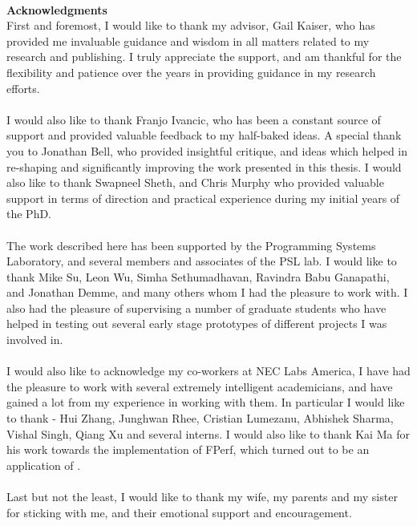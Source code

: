 ~\\[1in] %
\textbf{\Huge Acknowledgments}\\

\noindent 
First and foremost, I would like to thank my advisor, Gail Kaiser, who has provided me invaluable guidance and wisdom in all matters related to my research and publishing. I truly appreciate the support, and am thankful for the flexibility and patience over the years in providing guidance in my research efforts.
\\ \\
I would also like to thank Franjo Ivancic, who has been a constant source of support and provided valuable feedback to my half-baked ideas.
A special thank you to Jonathan Bell, who provided insightful critique, and ideas which helped in re-shaping and significantly improving the work presented in this thesis. I would also like to thank Swapneel Sheth, and Chris Murphy who provided valuable support in terms of direction and practical experience during my initial years of the PhD.
\\ \\
The work described here has been supported by the Programming Systems Laboratory, and several members and associates of the PSL lab. 
I would like to thank Mike Su, Leon Wu, Simha Sethumadhavan, Ravindra Babu Ganapathi, and Jonathan Demme, and many others whom I had the pleasure to work with. I also had the pleasure of supervising a number of graduate students who have helped in testing out several early stage prototypes of different projects I was involved in.
\\ \\
I would also like to acknowledge my co-workers at NEC Labs America, I have had the pleasure to work with several extremely intelligent academicians, and have gained a lot from my experience in working with them. In particular I would like to thank - Hui Zhang, Junghwan Rhee, Cristian Lumezanu, Abhishek Sharma, Vishal Singh, Qiang Xu and several interns. I would also like to thank Kai Ma for his work towards the implementation of FPerf, which turned out to be an application of \iprobe. 
\\ \\
Last but not the least, I would like to thank my wife, my parents and my sister for sticking with me, and their emotional support and encouragement.
